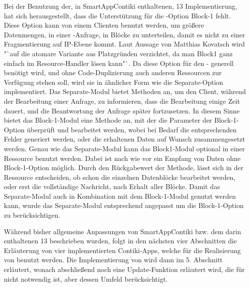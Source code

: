 Bei der Benutzung der, in SmartAppContiki enthaltenen,  13 Implementierung, hat sich herausgestellt, dass die Unterstützung für die -Option
Block-1 fehlt. Diese Option kann von einem Clienten benutzt werden, um größere Datenmengen, in einer -Anfrage, in Blöcke zu unterteilen, damit es nicht
zu einer Fragmentierung auf IP-Ebene kommt. Laut Aussage von Matthias Kovatsch wird "`auf die atomare Variante aus Platzgründen verzichtet, da man Block1 ganz
einfach im Resource-Handler lösen kann"`. Da diese Option für den - generell benötigt wird, und ohne Code-Duplizierung auch anderen Ressourcen
zur Verfügung stehen soll, wird sie in ähnlicher Form wie die Separate-Option implementiert. Das Separate-Modul bietet Methoden an, um den Client, während der
Bearbeitung einer Anfrage, zu informieren, dass die Bearbeitung einige Zeit dauert, und die Beantwortung der Anfrage später fortzusetzen. In diesem Sinne bietet
das Block-1-Modul eine Methode an, mit der die Parameter der Block-1-Option überprüft und bearbeitet werden, wobei bei Bedarf die entsprechenden Fehler generiert
werden, oder die erhaltenen Daten auf Wunsch zusammengesetzt werden. Genau wie das Separate-Modul kann das Block1-Modul optional in einer Ressource benutzt werden.
Dabei ist nach wie vor ein Empfang von Daten ohne Block-1-Option möglich. Durch den Rückgabewert der Methode, lässt sich in der Ressource entscheiden, ob schon
die einzelnen Datenblöcke bearbeitet werden, oder erst die vollständige Nachricht, nach Erhalt aller Blöcke. Damit das Separate-Modul auch in Kombination mit dem
Block-1-Modul genutzt werden kann, wurde das Separate-Modul entsprechend angepasst um die Block-1-Option zu berücksichtigen.

Während bisher allgemeine Anpassungen von SmartAppContiki bzw. dem darin enthaltenen  13 beschrieben wurden, folgt in den nächsten vier Abschnitten
die Erläuterung von vier implementierten Contiki-Apps, welche für die Realisierung von  benutzt werden. Die Implementierung von  wird dann
im 5. Abschnitt erläutert, wonach abschließend noch eine Update-Funktion erläutert wird, die für  nicht notwendig ist, aber dessen Umfeld berücksichtigt.






